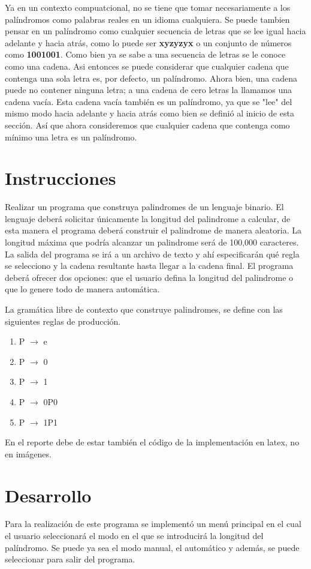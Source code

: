 \documentclass{article}
\begin{document}
	Ya en un contexto compuatcional, no se tiene que tomar necesariamente a los palíndromos como palabras reales en un idioma cualquiera. Se puede tambien pensar en un palíndromo como cualquier secuencia de letras que se lee igual hacia adelante y hacia atrás, como lo puede ser \textbf{xyzyzyx} o un conjunto de números como \textbf{1001001}. Como bien ya se sabe a una secuencia de letras se le conoce como una cadena. Asi entonces se puede considerar que cualquier cadena que contenga una sola letra es, por defecto, un palíndromo. Ahora bien, una cadena puede no contener ninguna letra; a una cadena de cero letras la llamamos una cadena vacía. Esta cadena vacía también es un palíndromo, ya que se "lee" del mismo modo hacia adelante y hacia atrás como bien se definió al inicio de esta sección. Así que ahora consideremos que cualquier cadena que contenga como mínimo una letra es un palíndromo. 
	
	\section*{Instrucciones}
	Realizar un programa que construya palindromes de un lenguaje binario. El lenguaje deberá solicitar únicamente la longitud del palindrome a calcular, de esta manera el programa deberá construir el palindrome de manera aleatoria. La longitud máxima que podría alcanzar un palindrome será de 100,000 caracteres. La salida del programa se irá a un archivo de texto y ahí especificarán qué regla se selecciono y la cadena resultante hasta llegar a la cadena final. El programa deberá ofrecer dos opciones: que el usuario defina la longitud del palindrome o que lo genere todo de manera automática.
	
	
	La gramática libre de contexto que construye palindromes, se define con las siguientes reglas de producción.
	\begin{enumerate}
		\item P $\rightarrow$ e
		\item P $\rightarrow$ 0
		\item P $\rightarrow$ 1
		\item P $\rightarrow$ 0P0
		\item P $\rightarrow$ 1P1	
	\end{enumerate}
	En el reporte debe de estar también el código de la implementación en latex, no en imágenes.
	\section*{Desarrollo}	
	Para la realización de este programa se implementó un menú principal en el cual el usuario seleccionará el modo en el que se introducirá la longitud del palíndromo. Se puede ya sea el modo manual, el automático y además, se puede seleccionar para salir del programa.
	
\end{document}
